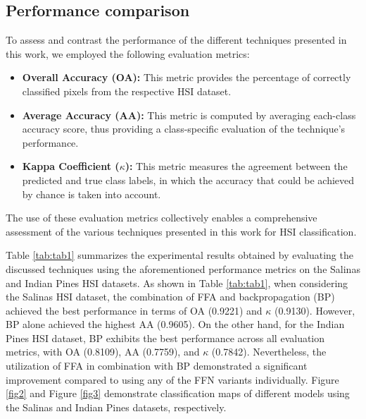 \documentclass{article}
\begin{document}
\subsection{Performance comparison}
To assess and contrast the performance of the different techniques presented in this work, we employed the following evaluation metrics:
\begin{itemize}
     \item \textbf{Overall Accuracy (OA):} This metric provides the percentage of correctly classified pixels from the respective HSI dataset.
     \item \textbf{Average Accuracy (AA):} This metric is computed by averaging each-class accuracy score, thus providing a class-specific evaluation of the technique's performance. %
     \item \textbf{Kappa Coefficient ($\kappa$):} This metric measures the agreement between the predicted and true class labels, in which the accuracy that could be achieved by chance is taken into account.
\end{itemize}

The use of these evaluation metrics collectively enables a comprehensive assessment of the various techniques presented in this work for HSI classification.

Table \ref{tab:tab1} summarizes the experimental results obtained by evaluating the discussed techniques using the aforementioned performance metrics on the Salinas and Indian Pines HSI datasets. As shown in Table \ref{tab:tab1}, when considering the Salinas HSI dataset, the combination of FFA and backpropagation (BP) achieved the best performance in terms of OA (0.9221) and $\kappa$ (0.9130). However, BP alone achieved the highest AA (0.9605). On the other hand, for the Indian Pines HSI dataset, BP exhibits the best performance across all evaluation metrics, with OA (0.8109), AA (0.7759), and $\kappa$ (0.7842). Nevertheless, the utilization of FFA in combination with BP demonstrated a significant improvement compared to using any of the FFN variants individually. Figure \ref{fig2} and Figure \ref{fig3} demonstrate classification maps of different models using the Salinas and Indian Pines datasets, respectively.
\end{document}
